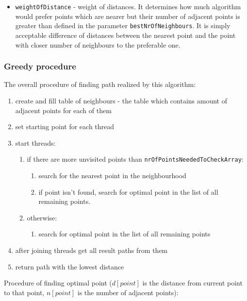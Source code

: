 \documentclass[titlepage]{article}
\begin{document}
\begin{itemize}
	\item \texttt{weightOfDistance} - weight of distances. It determines how much algorithm would prefer points which are nearer but their number of adjacent points is greater than defined in the parameter \texttt{bestNrOfNeighbours}. It is simply acceptable difference of distances between the nearest point and the point with closer number of neighbours to the preferable one.
	
\end{itemize}

\subsubsection{Greedy procedure}

The overall procedure of finding path realized by this algorithm:

\begin{enumerate}
	\item create and fill table of neighbours - the table which contains amount of adjacent points for each of them
	\item set starting point for each thread
	\item start threads:
	\begin{enumerate}[label*=\arabic*.]
		\item if there are more unvisited points than \texttt{nrOfPointsNeededToCheckArray}:
		\begin{enumerate}[label*=\arabic*.]
			\item search for the nearest point in the neighbourhood
			\item if point isn't found, search for optimal point in the list of all remaining points.
		\end{enumerate}
		\item otherwise:
		\begin{enumerate}[label*=\arabic*.]
			\item search for optimal point in the list of all remaining points
		\end{enumerate}
	\end{enumerate}
	\item after joining threads get all result paths from them
	\item return path with the lowest distance
\end{enumerate}

Procedure of finding optimal point ($d[point]$ is the distance from current point to that point, $n[point]$ is the number of adjacent points):
\end{document}
